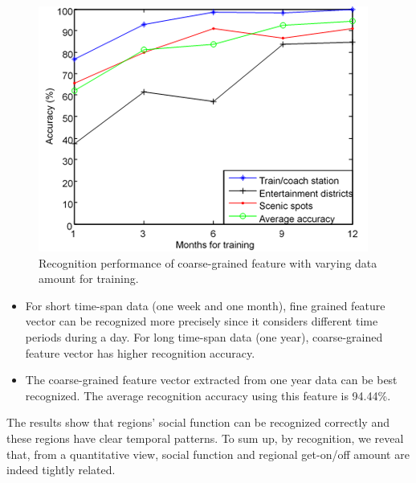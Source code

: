 \documentclass[a4paper, 10pt, conference]{ieeeconf}      %
\begin{document}
\begin{figure}[htbp]
    \centering
    \includegraphics{fig/f7.png}
    \caption{Recognition performance of coarse-grained feature with varying data amount for training.}
    \label{fig:my_label_5}
\end{figure}

\begin{itemize}
\item For short time-span data (one week and one month), fine grained feature vector can be recognized more precisely since it considers different time periods during a day. For long time-span data (one year), coarse-grained feature vector has higher recognition accuracy.
\item The coarse-grained feature vector extracted from one year data can be best recognized. The average recognition accuracy using this feature is 94.44\%.

\end{itemize}

The results show that regions’ social function can be recognized correctly and these regions have clear temporal patterns. To sum up, by recognition, we reveal that, from a quantitative view, social function and regional get-on/off amount are indeed tightly related.
\end{document}
